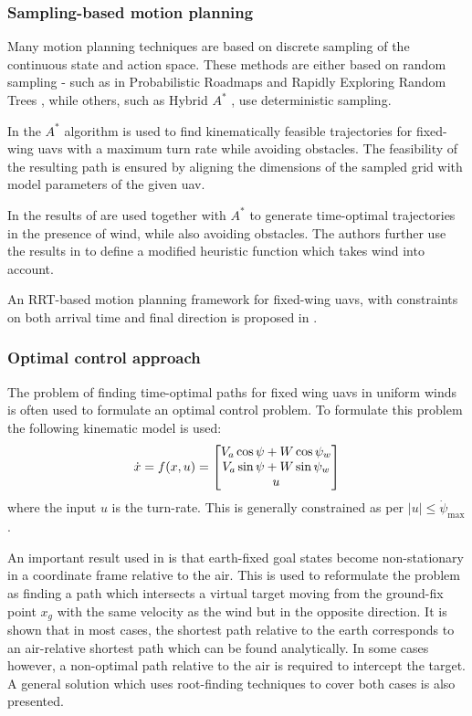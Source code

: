 \subsubsection{Sampling-based motion planning}
Many motion planning techniques are based on discrete sampling of the continuous state and action space. These methods are either based on 
random sampling - such as in Probabilistic Roadmaps \cite{prm} and Rapidly Exploring Random Trees \cite{rrt}, while others, such as Hybrid $A^*$ \cite{hybrid_astar}, use 
deterministic sampling.

In \cite{2_phase_uav} the $A^*$ algorithm \cite{astar} is used to find kinematically feasible trajectories for fixed-wing \acp{uav} with 
a maximum turn rate while avoiding obstacles. The feasibility of the resulting path is ensured by aligning the dimensions of the 
sampled grid with model parameters of the given \ac{uav}.

In \cite{wind_astar} the results of \cite{optimal_path_trochoidal} are used together with $A^*$ to generate time-optimal trajectories in the 
presence of wind, while also avoiding obstacles. The authors further use the results in \cite{optimal_path_target} to define a modified heuristic function which takes wind into account.

An RRT-based motion planning framework for fixed-wing \acp{uav}, with constraints on both arrival time and final direction 
is proposed in \cite{rrt_uav}.

\subsubsection{Optimal control approach}
The problem of finding time-optimal paths for fixed wing \acp{uav} in uniform winds is often used to formulate an optimal control problem. 
To formulate this problem the following kinematic model is used:
\begin{equation}
    \dot{x}=f(x, u)=
    \begin{bmatrix}
        V_a\cos\psi + W\cos\psi_w\\
        V_a\sin\psi + W\sin\psi_w\\
        u    
    \end{bmatrix} 
\end{equation}
where the input $u$ is the turn-rate. This is generally constrained as per $|u|\leq\dot{\psi}_{\text{max}}$ \cite{optimal_path_target}\cite{optimal_path_trochoidal}.

An important result used in \cite{optimal_path_target} is that earth-fixed goal states become non-stationary in a coordinate frame relative to the air. 
This is used to reformulate the problem as 
finding a path which intersects a virtual target moving from the ground-fix point $x_g$ with the same velocity as the wind but in the opposite direction. 
It is shown that in most cases, the shortest path relative to the earth corresponds to an air-relative shortest path which can be found analytically.
In some cases however, a non-optimal path relative to the air is required to 
intercept the target. A general solution which uses root-finding techniques to cover both cases is also presented.

